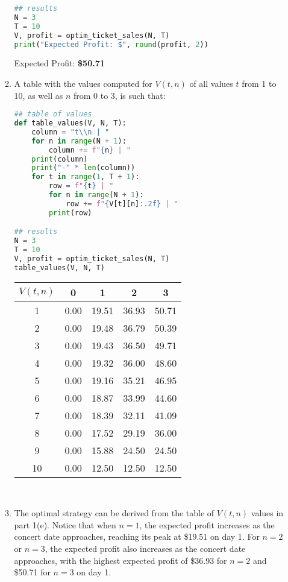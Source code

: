 \documentclass{article}
\begin{document}
\begin{enumerate}
\begin{enumerate}
\begin{lstlisting}[language=Python, title=Fig. Python 1(d)]
## results
N = 3
T = 10
V, profit = optim_ticket_sales(N, T)
print("Expected Profit: $", round(profit, 2))
\end{lstlisting}

        Expected Profit: \textbf{\$50.71}\\

        \item A table with the values computed for $V(t, n)$ of all values $t$ from 1 to 10, as well as $n$ from 0 to 3, is such that:
        \begin{lstlisting}[language=Python, title=Fig. Python 1(e)]
## table of values
def table_values(V, N, T):
    column = "t\\n | "
    for n in range(N + 1):
        column += f"{n} | "
    print(column)
    print("-" * len(column))
    for t in range(1, T + 1):
        row = f"{t} | "
        for n in range(N + 1):
            row += f"{V[t][n]:.2f} | "
        print(row)

## results
N = 3
T = 10
V, profit = optim_ticket_sales(N, T)
table_values(V, N, T)
\end{lstlisting}

        \begin{center}
            \begin{tabular}{c|c|c|c|c}
            $V(t,n)$ & 0 & 1 & 2 & 3 \\ \hline
            1 & 0.00 & 19.51 & 36.93 & 50.71 \\
            2 & 0.00 & 19.48 & 36.79 & 50.39 \\
            3 & 0.00 & 19.43 & 36.50 & 49.71 \\
            4 & 0.00 & 19.32 & 36.00 & 48.60 \\
            5 & 0.00 & 19.16 & 35.21 & 46.95 \\
            6 & 0.00 & 18.87 & 33.99 & 44.60 \\
            7 & 0.00 & 18.39 & 32.11 & 41.09 \\
            8 & 0.00 & 17.52 & 29.19 & 36.00 \\
            9 & 0.00 & 15.88 & 24.50 & 24.50 \\
            10 & 0.00 & 12.50 & 12.50 & 12.50 \\
            \end{tabular}
        \end{center}
        \,\\
        
        \item The optimal strategy can be derived from the table of $V(t, n)$ values in part 1(e). Notice that when $n = 1$, the expected profit increases as the concert date approaches, reaching its peak at \$19.51 on day 1. For $n = 2$ or $n = 3$, the expected profit also increases as the concert date approaches, with the highest expected profit of \$36.93 for $n = 2$ and \$50.71 for $n = 3$ on day 1.\\


\end{enumerate}
\end{enumerate}
\end{document}
